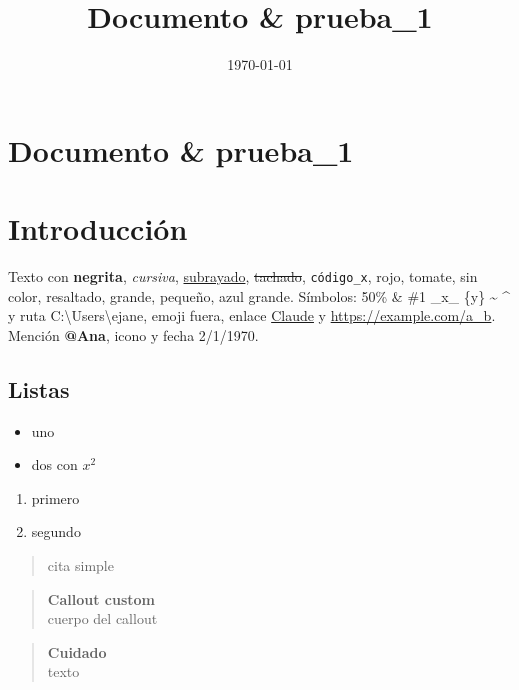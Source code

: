 \documentclass[11pt,a4paper]{article}
\title{Documento \& prueba\_1}
\author{}
\date{\today}
\begin{document}
\maketitle

\section{Documento \& prueba\_1}

\section{Introducción}

Texto con \textbf{negrita}, \textit{cursiva}, \underline{subrayado}, \sout{tachado}, \texttt{código\_x}, \textcolor[RGB]{225,29,72}{rojo}, \textcolor[RGB]{255,99,71}{tomate}, sin color, \colorbox[RGB]{254,240,185}{resaltado}, {\fontsize{16.5pt}{19.8pt}\selectfont grande}, {\fontsize{9.6pt}{11.5pt}\selectfont pequeño}, \textcolor[RGB]{37,99,235}{{\fontsize{13.8pt}{16.5pt}\selectfont azul grande}}.
Símbolos: 50\% \& \#1 \_x\_ \{y\} \textasciitilde{} \textasciicircum{} y ruta C:\textbackslash{}Users\textbackslash{}ejane, emoji  fuera, enlace \href{https://claude.com}{Claude} y \url{https://example.com/a_b}.
Mención \textbf{@Ana}, icono  y fecha 2/1/1970.

\subsection{Listas}

\begin{itemize}
  \item uno
  \item dos con $x^2$
\end{itemize}

\begin{enumerate}
  \item primero
  \item segundo
\end{enumerate}

\begin{quote}
cita simple
\end{quote}

\begin{quote}
\textcolor[RGB]{255,0,170}{\textbf{Callout custom}}\\
cuerpo del callout
\end{quote}

\begin{quote}
\textcolor[RGB]{251,191,36}{\textbf{Cuidado}}\\
texto
\end{quote}
\end{document}
